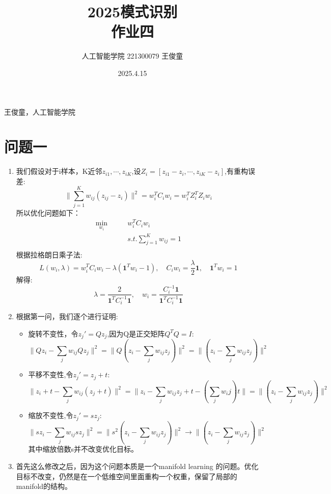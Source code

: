 \documentclass[answers]{exam}  %
\title{2025模式识别 \\ 作业四}
\date{2025.4.15}
\author{人工智能学院 221300079 王俊童}
\begin{document}
{} 王俊童，人工智能学院
\section{问题一}
\begin{enumerate}[label=\alph*.] 
    \item 我们假设对于i样本，K近邻$z_{i1},\cdots, z_{iK}$,设$Z_i = [z_{i1}-z_i,\cdots,z_{iK} - z_i]$,有重构误差:
    \begin{equation*}
        \|\sum_{j=1}^{K} w_{ij}(z_{ij} - z_i)\|^2 = w_i^T C_i w_i = w_i^T Z_i^T Z_i w_i
    \end{equation*}
    所以优化问题如下：
    \begin{align*}
        \min_{w_i} &\qquad w_i^T C_i w_i\\
                   &\qquad s.t. \sum_{j=1}^{K} w_{ij} = 1\\ 
    \end{align*}
    根据拉格朗日乘子法:
    \[
        L(w_i, \lambda) = w_i^T C_i w_i - \lambda(\mathbf{1}^T w_i - 1), \quad  C_i w_i = \frac{\lambda}{2}\mathbf{1},\quad \mathbf{1}^T w_i = 1
    \]
    解得:
    \[
        \lambda = \frac{2}{\mathbf{1}^T C_i^{-1} \mathbf{1}}, \quad w_i = \frac{C_i^{-1} \mathbf{1}}{\mathbf{1}^T C_i^{-1} \mathbf{1}}
    \]
    \item 根据第一问，我们逐个进行证明:
    \begin{itemize}
        \item 旋转不变性，令$z_j' = Qz_j$,因为Q是正交矩阵$Q^TQ = I$:
        \[
            \|Qz_i - \sum_{j}w_{ij}Qz_j\|^2 = \|Q(z_i - \sum_{j}w_{ij}z_j)\|^2 = \|(z_i - \sum_{j}w_{ij}z_j)\|^2 
        \]
        \item 平移不变性,令$z_j'= z_j + t$:
        \[
            \|z_i +t - \sum_{j}w_{ij}(z_j + t)\|^2 = \|z_i - \sum_{j}w_{ij}z_j + t - (\sum_{j} w_ij)t\| =  \|(z_i - \sum_{j}w_{ij}z_j)\|^2 
        \]
        \item 缩放不变性,令$z_j' = sz_j$:
        \[
            \|sz_i - \sum_{j}w_{ij}sz_j\|^2 = \|s^2(z_i - \sum_{j}w_{ij}z_j)\|^2 \rightarrow  \|(z_i - \sum_{j}w_{ij}z_j)\|^2 
        \]
        其中缩放倍数s并不改变优化目标。
    \end{itemize}
    \item 首先这么修改之后，因为这个问题本质是一个manifold learning 的问题。优化目标不改变，仍然是在一个低维空间里面重构一个权重，保留了局部的manifold的结构。
    

\end{enumerate}
\end{document}
